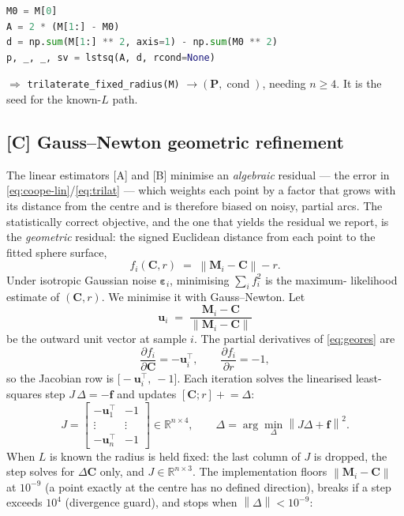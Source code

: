 \documentclass[11pt,a4paper]{article}
\newcommand{\M}{\mathbf{M}}
\newcommand{\bP}{\mathbf{P}}
\newcommand{\bC}{\mathbf{C}}
\newcommand{\bu}{\mathbf{u}}
\newcommand{\beps}{\boldsymbol{\varepsilon}}
\newcommand{\R}{\mathbb{R}}
\newcommand{\norm}[1]{\left\lVert #1 \right\rVert}
\begin{document}
\begin{lstlisting}[language=Python]
M0 = M[0]
A = 2 * (M[1:] - M0)
d = np.sum(M[1:] ** 2, axis=1) - np.sum(M0 ** 2)
p, _, _, sv = lstsq(A, d, rcond=None)
\end{lstlisting}

\noindent $\Rightarrow$ \texttt{trilaterate\_fixed\_radius(M)} $\to (\bP,
\operatorname{cond})$, needing $n \ge 4$. It is the seed for the known-$L$ path.

\subsection{[C] Gauss--Newton geometric refinement}
\label{sec:gn}

The linear estimators [A] and [B] minimise an \emph{algebraic} residual --- the
error in \eqref{eq:coope-lin}/\eqref{eq:trilat} --- which weights each point by a
factor that grows with its distance from the centre and is therefore biased on
noisy, partial arcs. The statistically correct objective, and the one that yields
the residual we report, is the \emph{geometric} residual: the signed Euclidean
distance from each point to the fitted sphere surface,
\begin{equation}
  f_i(\bC, r) \;=\; \norm{\M_i - \bC} - r .
  \label{eq:geores}
\end{equation}
Under isotropic Gaussian noise $\beps_i$, minimising $\sum_i f_i^2$ is the maximum-
likelihood estimate of $(\bC, r)$. We minimise it with Gauss--Newton. Let
\begin{equation}
  \bu_i \;=\; \frac{\M_i - \bC}{\norm{\M_i - \bC}}
\end{equation}
be the outward unit vector at sample $i$. The partial derivatives of
\eqref{eq:geores} are
\begin{equation}
  \frac{\partial f_i}{\partial \bC} = -\bu_i^\top, \qquad
  \frac{\partial f_i}{\partial r} = -1 ,
\end{equation}
so the Jacobian row is $\big[-\bu_i^\top,\ -1\big]$. Each iteration solves the
linearised least-squares step $J\,\Delta = -\mathbf{f}$ and updates
$[\bC; r] \mathrel{+}= \Delta$:
\begin{equation}
  J = \begin{bmatrix} -\bu_1^\top & -1 \\ \vdots & \vdots \\ -\bu_n^\top & -1 \end{bmatrix}
  \in \R^{n\times 4},
  \qquad
  \Delta = \arg\min_\Delta \norm{J\Delta + \mathbf{f}}^2 .
\end{equation}
When $L$ is known the radius is held fixed: the last column of $J$ is dropped, the
step solves for $\Delta\bC$ only, and $J \in \R^{n\times 3}$. The implementation
floors $\norm{\M_i-\bC}$ at $10^{-9}$ (a point exactly at the centre has no defined
direction), breaks if a step exceeds $10^4$ (divergence guard), and stops when
$\norm{\Delta} < 10^{-9}$:
\end{document}
